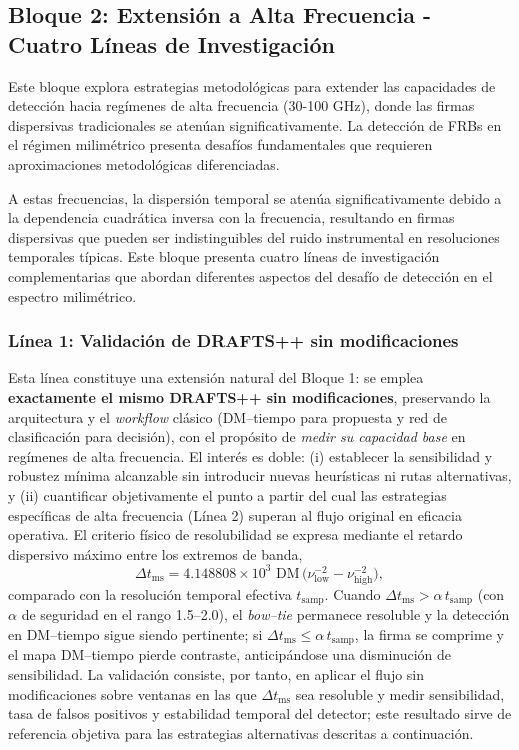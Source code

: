 \subsection{Bloque 2: Extensión a Alta Frecuencia - Cuatro Líneas de Investigación}

Este bloque explora estrategias metodológicas para extender las capacidades de detección hacia regímenes de alta frecuencia (30-100 GHz), donde las firmas dispersivas tradicionales se atenúan significativamente. La detección de FRBs en el régimen milimétrico presenta desafíos fundamentales que requieren aproximaciones metodológicas diferenciadas.

A estas frecuencias, la dispersión temporal se atenúa significativamente debido a la dependencia cuadrática inversa con la frecuencia, resultando en firmas dispersivas que pueden ser indistinguibles del ruido instrumental en resoluciones temporales típicas. Este bloque presenta cuatro líneas de investigación complementarias que abordan diferentes aspectos del desafío de detección en el espectro milimétrico.

\subsubsection{Línea 1: Validación de DRAFTS++ sin modificaciones}

Esta línea constituye una extensión natural del Bloque 1: se emplea \textbf{exactamente el mismo DRAFTS++ sin modificaciones}, preservando la arquitectura y el \emph{workflow} clásico (DM–tiempo para propuesta y red de clasificación para decisión), con el propósito de \textit{medir su capacidad base} en regímenes de alta frecuencia. El interés es doble: (i) establecer la sensibilidad y robustez mínima alcanzable sin introducir nuevas heurísticas ni rutas alternativas, y (ii) cuantificar objetivamente el punto a partir del cual las estrategias específicas de alta frecuencia (Línea 2) superan al flujo original en eficacia operativa. El criterio físico de resolubilidad se expresa mediante el retardo dispersivo máximo entre los extremos de banda,
\[
\Delta t_{\mathrm{ms}} = 4.148808 \times 10^{3}\,\, \mathrm{DM}\,\big(\nu_{\mathrm{low}}^{-2}-\nu_{\mathrm{high}}^{-2}\big),
\]
comparado con la resolución temporal efectiva $t_{\mathrm{samp}}$. Cuando $\Delta t_{\mathrm{ms}} > \alpha\, t_{\mathrm{samp}}$ (con $\alpha$ de seguridad en el rango 1.5–2.0), el \textit{bow–tie} permanece resoluble y la detección en DM–tiempo sigue siendo pertinente; si $\Delta t_{\mathrm{ms}} \le \alpha\, t_{\mathrm{samp}}$, la firma se comprime y el mapa DM–tiempo pierde contraste, anticipándose una disminución de sensibilidad. La validación consiste, por tanto, en aplicar el flujo sin modificaciones sobre ventanas en las que $\Delta t_{\mathrm{ms}}$ sea resoluble y medir sensibilidad, tasa de falsos positivos y estabilidad temporal del detector; este resultado sirve de referencia objetiva para las estrategias alternativas descritas a continuación.


